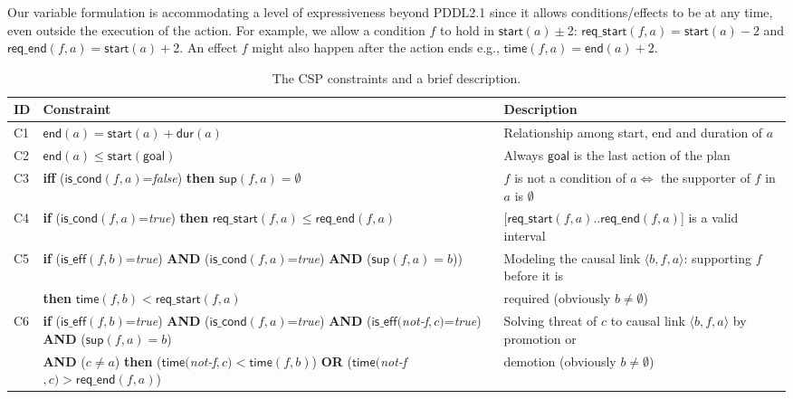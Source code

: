 \documentclass{ecai}
\newcommand{\tup}[1]{{\langle #1 \rangle}}
\newcommand{\dur}{\mathsf{dur}}    %
\newcommand{\iscond}{\mathsf{is\_cond}}    %
\newcommand{\iseff}{\mathsf{is\_eff}}    %
\newcommand{\start}{\mathsf{start}}%
\newcommand{\en}{\mathsf{end}}     %
\newcommand{\supp}{\mathsf{sup}}   %
\newcommand{\tim}{\mathsf{time}}   %
\newcommand{\reqs}{\mathsf{req\_{start}}} %
\newcommand{\reqe}{\mathsf{req\_{end}}}   %
\newcommand{\goal}{\mathsf{goal}}  %
\begin{document}
Our variable formulation is accommodating a level of expressiveness beyond PDDL2.1 since it allows conditions/effects to be at any time, even outside the execution of the action. For example, we allow a condition $f$ to hold in $\start(a)\pm$2: $\reqs(f,a)=\start(a)-2$ and $\reqe(f,a)=\start(a)+2$. An effect $f$ might also happen after the action ends e.g., $\tim(f,a)=\en(a)+2$. 

\begin{table*}
\begin{center}
\caption{The CSP constraints and a brief description.}	
\begin{scriptsize}
\begin{tabular}{p{0.1cm}p{10.2cm}p{6.4cm}}
\hline
{\bf ID}&{\bf Constraint}&{\bf Description}\\\hline
			
C1& $\en(a)=\start(a)+\dur(a)$ & Relationship among start, end and duration of $a$ \\

C2& $\en(a) \leq \start(\goal)$ & Always $\goal$ is the last action of the plan \\

C3& \textbf{iff} ($\iscond(f,a)$=\textit{false}) \textbf{then} $\supp(f,a) = \emptyset$ & $f$ is not a condition of $a \iff $ the supporter of $f$ in $a$ is $\emptyset$ \\

C4& \textbf{if} ($\iscond(f,a)$=\textit{true}) \textbf{then} $\reqs(f,a) \leq \reqe(f,a)$ & [$\reqs(f,a)..\reqe(f,a)$] is a valid interval\\

C5& \textbf{if} ($\iseff(f,b)$=\textit{true}) \textbf{AND} ($\iscond(f,a)$=\textit{true}) \textbf{AND} ($\supp(f,a)=b$))  & Modeling the causal link $\tup{b,f,a}$: supporting $f$ before it is \\
&\hspace{0.2cm}\textbf{then} $\tim(f,b) < \reqs(f,a)$ & required (obviously $b \neq \emptyset$) \\

C6& \textbf{if} ($\iseff(f,b)$=\textit{true}) \textbf{AND} ($\iscond(f,a)$=\textit{true}) \textbf{AND} ($\iseff($\textit{not-f}$,c)$=\textit{true}) \textbf{AND} ($\supp(f,a)=b$) & Solving threat of $c$ to causal link $\tup{b,f,a}$ by promotion or \\
&\hspace{0.2cm}\textbf{AND} ($c \neq a$) \textbf{then} ($\tim($\textit{not-f}$,c) < \tim(f,b)$) \textbf{OR} ($\tim($\textit{not-f}$,c) > \reqe(f,a)$) & demotion (obviously $b \neq \emptyset$) \\


\end{tabular}
\end{scriptsize}
\end{center}
\end{table*}
\end{document}
